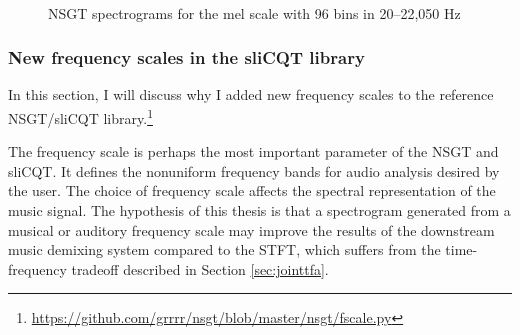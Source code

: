 \documentclass[report.tex]{subfiles}
\begin{document}
\begin{figure}[ht]
	\centering
	\\
	\caption{NSGT spectrograms for the mel scale with 96 bins in 20--22,050 Hz}
	\label{fig:overlappedspectrograms}
\end{figure}

\subsubsection{New frequency scales in the sliCQT library}
\label{sec:improvelib}

In this section, I will discuss why I added new frequency scales to the reference NSGT/sliCQT library.\footnote{\url{https://github.com/grrrr/nsgt/blob/master/nsgt/fscale.py}}

The frequency scale is perhaps the most important parameter of the NSGT and sliCQT. It defines the nonuniform frequency bands for audio analysis desired by the user. The choice of frequency scale affects the spectral representation of the music signal. The hypothesis of this thesis is that a spectrogram generated from a musical or auditory frequency scale may improve the results of the downstream music demixing system compared to the STFT, which suffers from the time-frequency tradeoff described in Section \ref{sec:jointtfa}.
\end{document}
